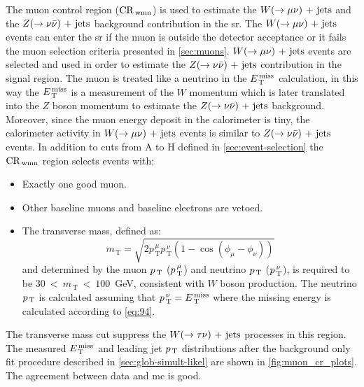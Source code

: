 The muon control region ($\mathrm{CR}_\mathrm{\, wmn}$) is used to estimate the $W (\rightarrow \mu \nu)\mathrm{~+~jets}$ and
the $Z (\rightarrow \nu \bar{\nu})\mathrm{~+~jets}$ background contribution in the \gls{sr}\@. The
$W (\rightarrow \mu \nu)\mathrm{~+~jets}$ events can enter the \gls{sr} if the muon is outside the
detector acceptance or it fails the muon selection criteria presented in
\cref{sec:muons}. $W (\rightarrow \mu \nu)\mathrm{~+~jets}$ events are selected and used in order to
estimate the $Z (\rightarrow \nu \bar{\nu})\mathrm{~+~jets}$ contribution in the signal region. The muon is
treated like a neutrino in the $E_\mathrm{\, T}^\mathrm{\, miss}$ calculation, in this way the $E_\mathrm{\, T}^\mathrm{\, miss}$ is a
measurement of the $W$ momentum which is later translated into the $Z$ boson
momentum to estimate the $Z (\rightarrow \nu \bar{\nu})\mathrm{~+~jets}$ background. Moreover, since the muon
energy deposit in the calorimeter is tiny, the calorimeter activity in
$W (\rightarrow \mu \nu)\mathrm{~+~jets}$ events is similar to $Z (\rightarrow \nu \bar{\nu})\mathrm{~+~jets}$ events. In addition to
cuts from A to H defined in \cref{sec:event-selection} the $\mathrm{CR}_\mathrm{\, wmn}$ region
selects events with:
\begin{itemize}
\item Exactly one good muon.
\item Other baseline muons and baseline electrons are vetoed.
\item The transverse mass, defined as:
  \begin{equation}
    \label{eq:99}
    m_\mathrm{\, T} = \sqrt{2 p_\mathrm{\, T}^{\, \mu} p_\mathrm{\, T}^{\, \nu}
      (1 - \cos(\phi_\mu - \phi_\nu))}
  \end{equation}
  and determined by the muon $p_\mathrm{\, T}$ ($p_\mathrm{\, T}^{\, \mu}$) and neutrino $p_\mathrm{\, T}$
  ($p_\mathrm{\, T}^{\, \nu}$), is required to be $30~<~m_\mathrm{\, T}~<~100$~GeV,
  consistent with $W$ boson production. The neutrino $p_\mathrm{\, T}$ is calculated
  assuming that $p_\mathrm{\, T}^{\, \nu} = E_\mathrm{\, T}^\mathrm{\, miss}$ where the missing energy is calculated
  according to \cref{eq:94}.
\end{itemize}
The transverse mass cut suppress the $W (\rightarrow \tau \nu)\mathrm{~+~jets}$ processes in this
region. The measured $E_\mathrm{\, T}^\mathrm{\, miss}$ and leading jet $p_\mathrm{\, T}$ distributions after the
background only fit procedure described in \cref{sec:glob-simult-likel} are
shown in \cref{fig:muon_cr_plots}.
The agreement between data and \gls{mc} is good.

